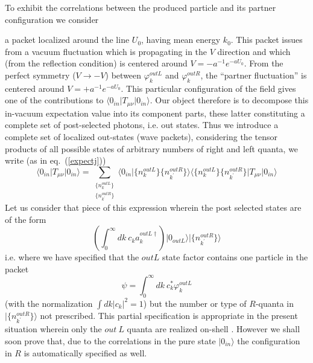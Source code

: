 \documentclass[12pt,oneside]{report}
\def\ket#1{|#1\rangle}
\def\p {\prime}
\begin{document}
To exhibit the correlations between the produced particle
and its partner configuration we consider 

a packet localized around the line
$U_0$, having mean energy $k_0$. This packet issues from
a vacuum fluctuation which is propagating in the $V$ 
direction and which (from the reflection condition) is
centered around $V = - a^{-1} e^{-a U_0}$. From 
the perfect symmetry ($V \to - V$) between $\varphi_k^{out  L}$ and $\varphi_k^{out  R}$, the ``partner fluctuation'' is centered
around $V= + a^{-1} e^{-a U_0}$. 
 This particular
configuration of the field gives one of the contributions
to $\langle 0_{in} \vert T_{\mu\nu}\vert 0_{in}\rangle$.
Our object therefore is to decompose this in-vacuum expectation
value into its component parts, these latter constituting a
complete set of post-selected photons, i.e. out states. Thus we introduce a
complete set of localized out-states (wave packets), considering the 
tensor products of all possible
states of arbitrary numbers of right and left quanta, we write (as in
eq.~(\ref{expectj}))
\begin{equation} 
\langle 0_{in} \vert T_{\mu\nu}\vert
0_{in}\rangle   = \sum_{ \begin{array}{c}
\{n_k^{out  L} \}\\
\{ n_{k^\p}^{out  R}\} 
\end{array}
}
\langle 0_{in}
\vert \{n_k^{out  L} \}\{ n_{k^\p}^{out  R}\} \rangle
\langle \{n_k^{out  L} \}\{ n_{k^\p}^{out  R}\}
 \vert T_{\mu\nu}\vert 0_{in}\rangle 
\label{Tf}
\end{equation}
Let us consider that piece of this expression wherein the post
selected states are of the form 
\begin{equation}
\left(\int_0^\infty\! dk \ c_k a^{out L
\dagger}_k\right) \ket{0_{out L}}\ket{\{ n_{k^\p}^{out  R}\}}
\label{Tg}
\end{equation}
i.e. where we have specified that the $out L$ state factor contains one
particle in the packet 
\begin{equation}
\psi = \int_0^\infty \! dk \ c_k^*
\varphi_k^{out  L}
\label{TgB}\end{equation}
 (with the normalization $\int dk \vert
c_k \vert^2 =1$) but the number or type of $R$-quanta in $ \ket{\{
n_{k^\p}^{out  R}\}}$ not prescribed. This
partial specification is appropriate in the present situation wherein only the $
out\ L$ quanta are realized on-shell \cite{MaPa}.
 However we shall soon prove that, due to
the correlations in the pure state $\ket{0_{in}}$ the 
configuration in $R$ is automatically
specified as well.
\end{document}
